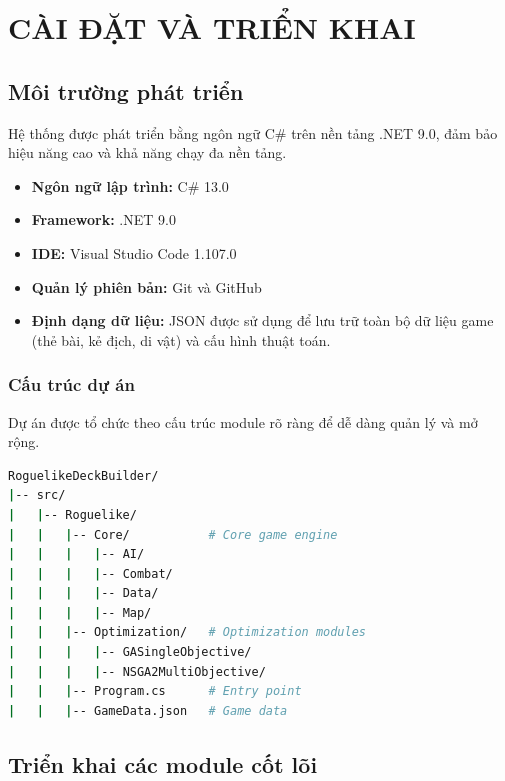 \clearpage
{}
\chapter{CÀI ĐẶT VÀ TRIỂN KHAI}

\section{Môi trường phát triển}

Hệ thống được phát triển bằng ngôn ngữ C\# trên nền tảng .NET 9.0, đảm bảo hiệu năng cao và khả năng chạy đa nền tảng.
\begin{itemize}
    \item \textbf{Ngôn ngữ lập trình:} C\# 13.0
    \item \textbf{Framework:} .NET 9.0
    \item \textbf{IDE:} Visual Studio Code 1.107.0
    \item \textbf{Quản lý phiên bản:} Git và GitHub
    \item \textbf{Định dạng dữ liệu:} JSON được sử dụng để lưu trữ toàn bộ dữ liệu game (thẻ bài, kẻ địch, di vật) và cấu hình thuật toán.
\end{itemize}

\subsection{Cấu trúc dự án}
Dự án được tổ chức theo cấu trúc module rõ ràng để dễ dàng quản lý và mở rộng.
\begin{lstlisting}[language=bash, caption={Cấu trúc thư mục dự án}]
RoguelikeDeckBuilder/
|-- src/
|   |-- Roguelike/
|   |   |-- Core/           # Core game engine
|   |   |   |-- AI/
|   |   |   |-- Combat/
|   |   |   |-- Data/
|   |   |   |-- Map/
|   |   |-- Optimization/   # Optimization modules
|   |   |   |-- GASingleObjective/
|   |   |   |-- NSGA2MultiObjective/
|   |   |-- Program.cs      # Entry point
|   |   |-- GameData.json   # Game data
\end{lstlisting}

\section{Triển khai các module cốt lõi}

